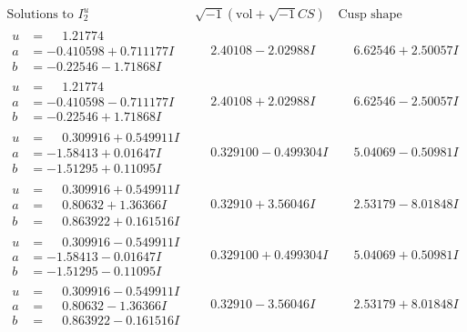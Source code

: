 \documentclass[1p]{elsarticle_modified}
\theoremstyle{definition}
\newcommand{\I}{\sqrt{-1}}
\begin{document}
$$\begin{array}{c|c|c}  
\text{Solutions to }I^u_{2}& \I (\text{vol} + \sqrt{-1}CS) & \text{Cusp shape}\\
 \hline 
\begin{aligned}
u &= \phantom{-}1.21774\phantom{ +0.000000I} \\
a &= -0.410598 + 0.711177 I \\
b &= -0.22546 - 1.71868 I\end{aligned}
 & \phantom{-}2.40108 - 2.02988 I & \phantom{-}6.62546 + 2.50057 I \\ \hline\begin{aligned}
u &= \phantom{-}1.21774\phantom{ +0.000000I} \\
a &= -0.410598 - 0.711177 I \\
b &= -0.22546 + 1.71868 I\end{aligned}
 & \phantom{-}2.40108 + 2.02988 I & \phantom{-}6.62546 - 2.50057 I \\ \hline\begin{aligned}
u &= \phantom{-}0.309916 + 0.549911 I \\
a &= -1.58413 + 0.01647 I \\
b &= -1.51295 + 0.11095 I\end{aligned}
 & \phantom{-}0.329100 - 0.499304 I & \phantom{-}5.04069 - 0.50981 I \\ \hline\begin{aligned}
u &= \phantom{-}0.309916 + 0.549911 I \\
a &= \phantom{-}0.80632 + 1.36366 I \\
b &= \phantom{-}0.863922 + 0.161516 I\end{aligned}
 & \phantom{-}0.32910 + 3.56046 I & \phantom{-}2.53179 - 8.01848 I \\ \hline\begin{aligned}
u &= \phantom{-}0.309916 - 0.549911 I \\
a &= -1.58413 - 0.01647 I \\
b &= -1.51295 - 0.11095 I\end{aligned}
 & \phantom{-}0.329100 + 0.499304 I & \phantom{-}5.04069 + 0.50981 I \\ \hline\begin{aligned}
u &= \phantom{-}0.309916 - 0.549911 I \\
a &= \phantom{-}0.80632 - 1.36366 I \\
b &= \phantom{-}0.863922 - 0.161516 I\end{aligned}
 & \phantom{-}0.32910 - 3.56046 I & \phantom{-}2.53179 + 8.01848 I \\ \hline\begin{aligned}

\end{aligned}
\end{array}$$
\end{document}
